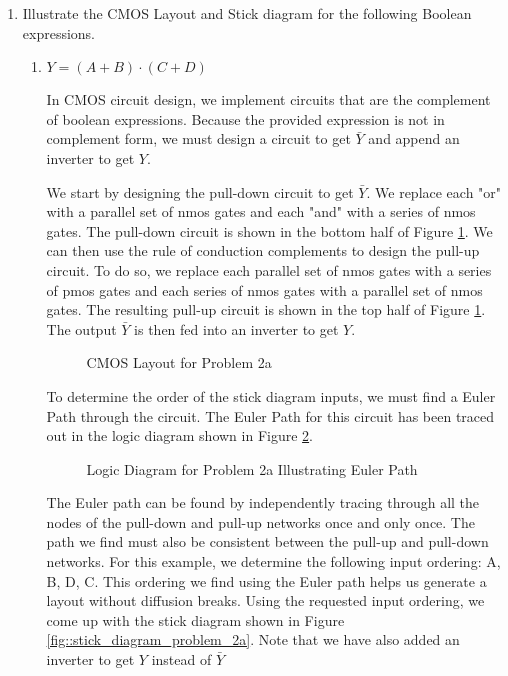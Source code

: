 \documentclass[fleqn]{article}
\begin{document}
\begin{enumerate}
		\item Illustrate the CMOS Layout and Stick diagram for the following Boolean expressions.
		
		\begin{enumerate}
			\item $Y = (A+B)\cdot(C+D)$
			
			In CMOS circuit design, we implement circuits that are the complement of boolean expressions. Because the provided expression is not in complement form, we must design a circuit to get $\bar{Y}$ and append an inverter to get $Y$.
			
			We start by designing the pull-down circuit to get $\bar{Y}$. We replace each "or" with a parallel set of nmos gates and each "and" with a series of nmos gates. The pull-down circuit is shown in the bottom half of Figure \ref{fig::cmos_layout_problem_2a}. We can then use the rule of conduction complements to design the pull-up circuit. To do so, we replace each parallel set of nmos gates with a series of pmos gates and each series of nmos gates with a parallel set of nmos gates. The resulting pull-up circuit is shown in the top half of Figure \ref{fig::cmos_layout_problem_2a}. The output $\bar{Y}$ is then fed into an inverter to get $Y$.
			
			\begin{figure}[H]
				\centerline{}
				\caption{CMOS Layout for Problem 2a}
				\label{fig::cmos_layout_problem_2a}
			\end{figure}
			
			To determine the order of the stick diagram inputs, we must find a Euler Path through the circuit. The Euler Path for this circuit has been traced out in the logic diagram shown in Figure \ref{fig::logic_diagram_problem_2a}.
			
			\begin{figure}[H]
				\centerline{}
				\caption{Logic Diagram for Problem 2a Illustrating Euler Path}
				\label{fig::logic_diagram_problem_2a}
			\end{figure}
			
			The Euler path can be found by independently tracing through all the nodes of the pull-down and pull-up networks once and only once. The path we find must also be consistent between the pull-up and pull-down networks. For this example, we determine the following input ordering: A, B, D, C. This ordering we find using the Euler path helps us generate a layout without diffusion breaks. Using the requested input ordering, we come up with the stick diagram shown in Figure \ref{fig::stick_diagram_problem_2a}. Note that we have also added an inverter to get $Y$ instead of $\bar{Y}$
			

\end{enumerate}
\end{enumerate}
\end{document}

